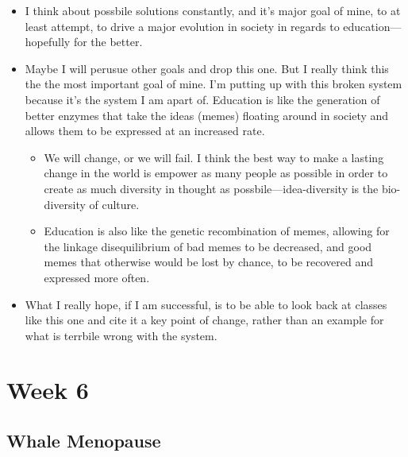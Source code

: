 \documentclass[12pt,a4paper]{article}
\begin{document}
    \begin{itemize}
        \item I think about possbile solutions constantly, and it's major goal of mine, to at least attempt, to drive a major evolution in society in regards to education---hopefully for the better.
        \item Maybe I will perusue other goals and drop this one. But I really think this the the most important goal of mine. I'm putting up with this broken system because it's the system I am apart of. Education is like the generation of better enzymes that take the ideas (memes) floating around in society and allows them to be expressed at an increased rate. 
            \begin{itemize}
                \item We will change, or we will fail. I think the best way to make a lasting change in the world is empower as many people as possible in order to create as much diversity in thought as possbile---idea-diversity is the bio-diversity of culture.
                \item Education is also like the genetic recombination of memes, allowing for the linkage disequilibrium of bad memes to be decreased, and good memes that otherwise would be lost by chance, to be recovered and expressed more often.
            \end{itemize}
        \item What I really hope, if I am successful, is to be able to look back at classes like this one and cite it a key point of change, rather than an example for what is terrbile wrong with the system.
    \end{itemize}

\clearpage
\section*{Week 6}
{}

\subsection{Whale Menopause}
\end{document}
